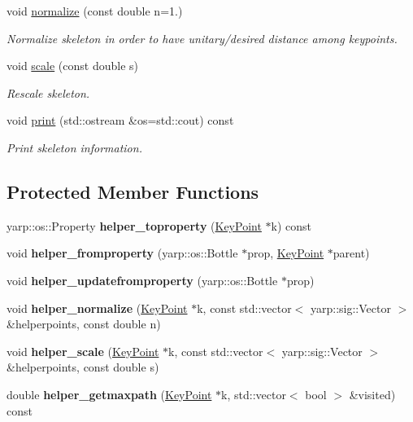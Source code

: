 \begin{DoxyCompactItemize}
void \hyperlink{classassistive__rehab_1_1Skeleton_a7753cc8d2b43e27eaf7bf9ef640a99cb}{normalize} (const double n=1.)
\begin{DoxyCompactList}\small\item\em Normalize skeleton in order to have unitary/desired distance among keypoints. \end{DoxyCompactList}\item 
void \hyperlink{classassistive__rehab_1_1Skeleton_a21fded128e2240e4dd507030b7386670}{scale} (const double s)
\begin{DoxyCompactList}\small\item\em Rescale skeleton. \end{DoxyCompactList}\item 
\mbox{\label{classassistive__rehab_1_1Skeleton_a58289ea0ba49220afac3e8d7128493b4}} 
void \hyperlink{classassistive__rehab_1_1Skeleton_a58289ea0ba49220afac3e8d7128493b4}{print} (std\+::ostream \&os=std\+::cout) const
\begin{DoxyCompactList}\small\item\em Print skeleton information. \end{DoxyCompactList}\end{DoxyCompactItemize}
\subsection*{Protected Member Functions}
\begin{DoxyCompactItemize}
\item 
\mbox{\label{classassistive__rehab_1_1Skeleton_ae448d21825bfd36eccb328d16fef995a}} 
yarp\+::os\+::\+Property {\bfseries helper\+\_\+toproperty} (\hyperlink{classassistive__rehab_1_1KeyPoint}{Key\+Point} $\ast$k) const
\item 
\mbox{\label{classassistive__rehab_1_1Skeleton_a8e8fcac9b911ce9eaa0a97b81bffb357}} 
void {\bfseries helper\+\_\+fromproperty} (yarp\+::os\+::\+Bottle $\ast$prop, \hyperlink{classassistive__rehab_1_1KeyPoint}{Key\+Point} $\ast$parent)
\item 
\mbox{\label{classassistive__rehab_1_1Skeleton_a8b1fa988e848ef1fc06439be8eaa19a4}} 
void {\bfseries helper\+\_\+updatefromproperty} (yarp\+::os\+::\+Bottle $\ast$prop)
\item 
\mbox{\label{classassistive__rehab_1_1Skeleton_a574ad07752a2a59ea765e10282998bb4}} 
void {\bfseries helper\+\_\+normalize} (\hyperlink{classassistive__rehab_1_1KeyPoint}{Key\+Point} $\ast$k, const std\+::vector$<$ yarp\+::sig\+::\+Vector $>$ \&helperpoints, const double n)
\item 
\mbox{\label{classassistive__rehab_1_1Skeleton_aefdf8624092fcc2b5458b0be108da01a}} 
void {\bfseries helper\+\_\+scale} (\hyperlink{classassistive__rehab_1_1KeyPoint}{Key\+Point} $\ast$k, const std\+::vector$<$ yarp\+::sig\+::\+Vector $>$ \&helperpoints, const double s)
\item 
\mbox{\label{classassistive__rehab_1_1Skeleton_a66ea19f4fbec2b654e394686180abf43}} 
double {\bfseries helper\+\_\+getmaxpath} (\hyperlink{classassistive__rehab_1_1KeyPoint}{Key\+Point} $\ast$k, std\+::vector$<$ bool $>$ \&visited) const
\end{DoxyCompactItemize}
